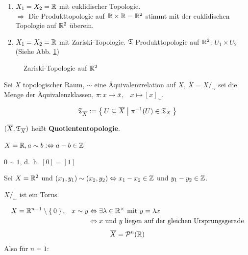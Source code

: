 \begin{beispiel}
    \begin{enumerate}[label=\arabic*)]
        \item $X_1 = X_2 = \mathbb{R}$ mit euklidischer Topologie.\\
              $\Rightarrow$ Die Produkttopologie auf $\mathbb{R} \times \mathbb{R} = \mathbb{R}^2$
              stimmt mit der euklidischen Topologie auf $\mathbb{R}^2$ überein.
        \item $X_1 = X_2 = \mathbb{R}$ mit Zariski-Topologie.
              $\mathfrak{T}$ Produkttopologie auf $\mathbb{R}^2$: $U_1 \times U_2$\\
              (Siehe Abb. \ref{fig:zariski-topologie})
    \end{enumerate}

    \begin{figure}[htp]
        \centering
        
        \caption{Zariski-Topologie auf $\mathbb{R}^2$}
        \label{fig:zariski-topologie}
    \end{figure}
\end{beispiel}

\begin{definition} 
    Sei $X$ topologischer Raum, $\sim$ eine Äquivalenzrelation auf $X$,
    $\overline{X} = X /_\sim$ sei die Menge der Äquivalenzklassen,
    $\pi: x \rightarrow \overline{x}, \;\;\; x \mapsto [x]_\sim$.

    \[\mathfrak{T}_{\overline{X}} := \Set{U \subseteq \overline{X} | \pi^{-1}(U) \in \mathfrak{T}_X}\]

    $(\overline{X}, \mathfrak{T}_{\overline{X}})$ heißt \textbf{Quotiententopologie}.
\end{definition}

\begin{beispiel}
    $X = \mathbb{R}, a \sim b :\Leftrightarrow a-b \in \mathbb{Z}$
    
    

    $0 \sim 1$, d.~h. $[0] = [1]$
\end{beispiel}

\begin{beispiel}
    Sei $X = \mathbb{R}^2$ und $(x_1, y_1) \sim (x_2, y_2) \Leftrightarrow x_1 - x_2 \in \mathbb{Z}$ 
    und $y_1 - y_2 \in \mathbb{Z}$.

    $X /_\sim$ ist ein Torus.
\end{beispiel}

\begin{beispiel}
    \begin{align*}
        X= \mathbb{R}^{n-1} \setminus \Set{0},\;\;\; x \sim y &\Leftrightarrow \exists \lambda \in \mathbb{R}^\times \text{ mit } y = \lambda x\\
            &\Leftrightarrow x \text{ und } y \text{ liegen auf der gleichen Ursprungsgerade}
    \end{align*}
    \[\overline{X} = \mathcal{P}^n(\mathbb{R})\]
    Also für $n=1$:\nopagebreak\\
    
\end{beispiel}

